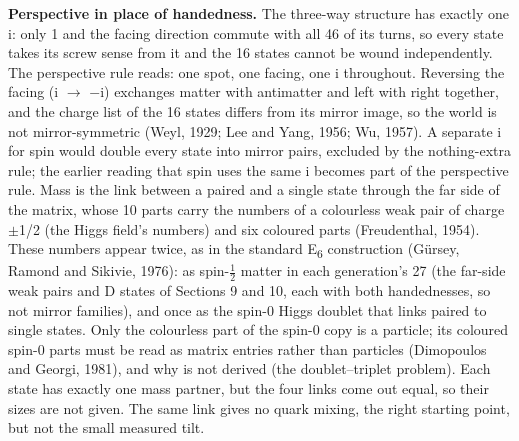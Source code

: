 \documentclass[
  11pt,
]{article}
\begin{document}
\textbf{Perspective in place of handedness.} The three-way structure has exactly one i: only 1 and the facing direction commute with all 46 of its turns, so every state takes its screw sense from it and the 16 states cannot be wound independently. The perspective rule reads: one spot, one facing, one i throughout. Reversing the facing (i \ensuremath{\to} \ensuremath{-}i) exchanges matter with antimatter and left with right together, and the charge list of the 16 states differs from its mirror image, so the world is not mirror-symmetric (Weyl, 1929; Lee and Yang, 1956; Wu, 1957). A separate i for spin would double every state into mirror pairs, excluded by the nothing-extra rule; the earlier reading that spin uses the same i becomes part of the perspective rule. Mass is the link between a paired and a single state through the far side of the matrix, whose 10 parts carry the numbers of a colourless weak pair of charge \ensuremath{\pm}1/2 (the Higgs field's numbers) and six coloured parts (Freudenthal, 1954). These numbers appear twice, as in the standard E\textsubscript{6} construction (Gürsey, Ramond and Sikivie, 1976): as spin-\ensuremath{\frac{1}{2}} matter in each generation's 27 (the far-side weak pairs and D states of Sections 9 and 10, each with both handednesses, so not mirror families), and once as the spin-0 Higgs doublet that links paired to single states. Only the colourless part of the spin-0 copy is a particle; its coloured spin-0 parts must be read as matrix entries rather than particles (Dimopoulos and Georgi, 1981), and why is not derived (the doublet--triplet problem). Each state has exactly one mass partner, but the four links come out equal, so their sizes are not given. The same link gives no quark mixing, the right starting point, but not the small measured tilt.
\end{document}
